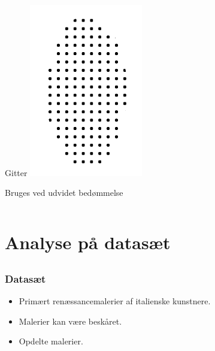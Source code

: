 \documentclass[xcolor=table]{beamer}
\begin{document}
\begin{frame}
\begin{columns}[t]
        \begin{exampleblock}{Gitter}
            \centering
            \includegraphics[width=0.6\textwidth]{billeder/blob_grid}

            Bruges ved udvidet bedømmelse
        \end{exampleblock}
    \end{columns}

\end{frame}

\section{Analyse på datasæt}
\subsection*{}
\begin{frame}

    \frametitle{Datasæt}

    \begin{itemize}
        \item Primært renæssancemalerier af italienske kunstnere.
        \item Malerier kan være beskåret.
        \item Opdelte malerier.
    \end{itemize}

\end{frame}
\end{document}
